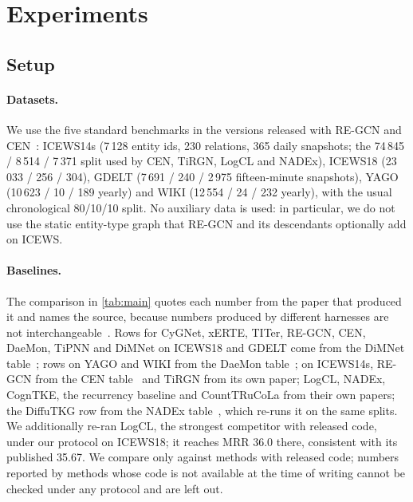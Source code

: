 \section{Experiments}
\label{sec:exp}

\subsection{Setup}

\paragraph{Datasets.}
We use the five standard benchmarks in the versions released with RE-GCN and CEN~\cite{li2021regcn,li2022cen}: ICEWS14s (7\,128 entity ids, 230 relations, 365 daily snapshots; the 74\,845 / 8\,514 / 7\,371 split used by CEN, TiRGN, LogCL and NADEx), ICEWS18 (23\,033 / 256 / 304), GDELT (7\,691 / 240 / 2\,975 fifteen-minute snapshots), YAGO (10\,623 / 10 / 189 yearly) and WIKI (12\,554 / 24 / 232 yearly), with the usual chronological 80/10/10 split. No auxiliary data is used: in particular, we do not use the static entity-type graph that RE-GCN and its descendants optionally add on ICEWS.

\paragraph{Baselines.}
The comparison in \cref{tab:main} quotes each number from the paper that produced it and names the source, because numbers produced by different harnesses are not interchangeable~\cite{gastinger2023apples}. Rows for CyGNet, xERTE, TITer, RE-GCN, CEN, DaeMon, TiPNN and DiMNet on ICEWS18 and GDELT come from the DiMNet table~\cite{dong2025dimnet}; rows on YAGO and WIKI from the DaeMon table~\cite{dong2023daemon}; on ICEWS14s, RE-GCN from the CEN table~\cite{li2022cen} and TiRGN from its own paper; LogCL, NADEx, CognTKE, the recurrency baseline and CountTRuCoLa from their own papers; the DiffuTKG row from the NADEx table~\cite{nadex2026}, which re-runs it on the same splits. We additionally re-ran LogCL, the strongest competitor with released code, under our protocol on ICEWS18; it reaches MRR 36.0 there, consistent with its published 35.67. We compare only against methods with released code; numbers reported by methods whose code is not available at the time of writing cannot be checked under any protocol and are left out.

